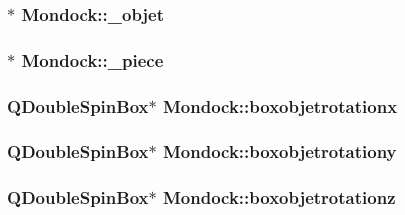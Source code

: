 \hypertarget{class_mondock_a6325a3fb92643c99815b1a8025f7d401}{
\subsubsection[{\+\_\+objet}]{$\ast$ Mondock\+::\+\_\+objet}}\label{class_mondock_a6325a3fb92643c99815b1a8025f7d401}
\hypertarget{class_mondock_a8a9c524e7a781e45219699b15b20596f}{
\subsubsection[{\+\_\+piece}]{$\ast$ Mondock\+::\+\_\+piece}}\label{class_mondock_a8a9c524e7a781e45219699b15b20596f}
\hypertarget{class_mondock_accc1854d02d6d2a0b61297b351bd196a}{
\subsubsection[{boxobjetrotationx}]{\setlength{\rightskip}{0pt plus 5cm}Q\+Double\+Spin\+Box$\ast$ Mondock\+::boxobjetrotationx\hspace{0.3cm}{\ttfamily [private]}}}\label{class_mondock_accc1854d02d6d2a0b61297b351bd196a}
\hypertarget{class_mondock_aeeea985e7f23ebf81696648d8e0dea40}{
\subsubsection[{boxobjetrotationy}]{\setlength{\rightskip}{0pt plus 5cm}Q\+Double\+Spin\+Box$\ast$ Mondock\+::boxobjetrotationy\hspace{0.3cm}{\ttfamily [private]}}}\label{class_mondock_aeeea985e7f23ebf81696648d8e0dea40}
\hypertarget{class_mondock_af722379e41c8ebc43f6068754564aa4f}{
\subsubsection[{boxobjetrotationz}]{\setlength{\rightskip}{0pt plus 5cm}Q\+Double\+Spin\+Box$\ast$ Mondock\+::boxobjetrotationz\hspace{0.3cm}{\ttfamily [private]}}}\label{class_mondock_af722379e41c8ebc43f6068754564aa4f}
